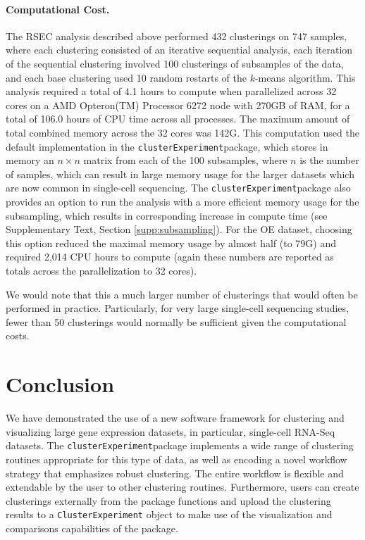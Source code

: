 \documentclass[10pt,letterpaper]{article}
\newcommand{\f}[1]{\texttt{#1}}
\newcommand{\CE}{\f{clusterExperiment}}
\begin{document}
\begin{figure}
\label{fig:CompareDifferent}
\end{figure}


\paragraph{Computational Cost.}

The RSEC analysis described above performed 432 clusterings on 747 samples, where each clustering consisted of an iterative sequential analysis, each iteration of the sequential clustering involved 100 clusterings of subsamples of the data, and each base clustering used 10 random restarts of the $k$-means algorithm. This analysis required a total of 4.1 hours to compute when parallelized across 32 cores on a AMD Opteron(TM) Processor 6272 node with 270GB of RAM, for a total of 106.0 hours of CPU time across all processes. The maximum amount of total combined memory across the 32 cores was 142G.  This computation used the default implementation in the \CE package, which stores in memory an $n\times n$ matrix from each of the 100 subsamples, where $n$ is the number of samples, which can result in large memory usage for the larger datasets which are now common in single-cell sequencing. The \CE package also provides an option to run the analysis with a more efficient memory usage for the subsampling, which results in corresponding increase in compute time (see Supplementary Text, Section \ref{supp:subsampling}). For the OE dataset, choosing this option reduced the maximal memory usage by almost half (to 79G) and required 2,014 CPU hours to compute (again these numbers are reported as totals across the parallelization to 32 cores).

We would note that this a much larger number of clusterings that would often be performed in practice. Particularly, for very large single-cell sequencing studies, fewer than 50 clusterings would normally be sufficient given the computational costs.  

\section{Conclusion}

We have demonstrated the use of a new software framework for clustering and visualizing large gene expression datasets, in particular, single-cell RNA-Seq datasets. The \CE package implements a wide range of clustering routines appropriate for this type of data, as well as encoding a novel workflow strategy that emphasizes robust clustering. The entire workflow is flexible and extendable by the user to other clustering routines. Furthermore, users can create clusterings externally from the package functions and upload the clustering results to a \f{ClusterExperiment} object to make use of the visualization and comparisons capabilities of the package.
\end{document}
